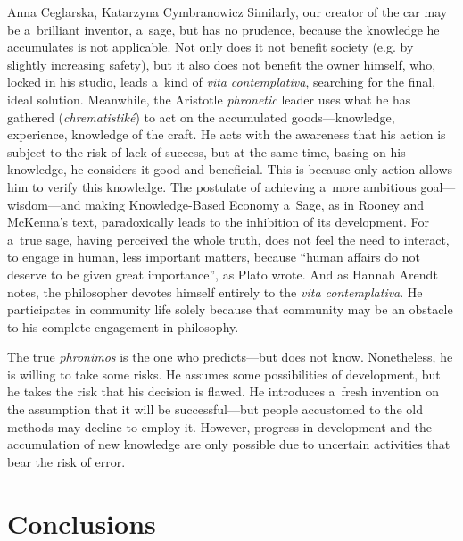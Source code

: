 \begin{artengenv2auth}{Anna Ceglarska, Katarzyna Cymbranowicz}
Similarly, our creator of the car may be a~brilliant inventor, a~sage, but has no prudence, because the knowledge he accumulates is not applicable. Not only does it not benefit society (e.g. by slightly increasing safety), but it also does not benefit the owner himself, who, locked in his studio, leads a~kind of \textit{vita} \textit{contemplativa}, searching for the final, ideal solution. Meanwhile, the Aristotle \textit{phronetic} leader uses what he has gathered (\textit{chrematistiké}) to act on the accumulated goods---knowledge, experience, knowledge of the craft. He acts with the awareness that his action is subject to the risk of lack of success, but at the same time, basing on his knowledge, he considers it good and beneficial. This is because only action allows him to verify this knowledge. The postulate of achieving a~more ambitious goal---wisdom---and making Knowledge-Based Economy a~Sage, as in Rooney and McKenna's text, paradoxically leads to the inhibition of its development. For a~true sage, having perceived the whole truth, does not feel the need to interact, to engage in human, less important matters, because ``human affairs do not deserve to be given great importance'', as Plato 
\parencite[][803b]{plato_plato_1967-1} %
 wrote. And as Hannah Arendt 
\parencite*[][p.32]{arendt_promise_2005} %
 notes, the philosopher devotes himself entirely to the \textit{vita contemplativa}. He participates in community life solely because that community may be an obstacle to his complete engagement in philosophy.



The true \textit{phronimos} is the one who predicts---but does not know. Nonetheless, he is willing to take some risks. He assumes some possibilities of development, but he takes the risk that his decision is flawed. He introduces a~fresh invention on the assumption that it will be successful---but people accustomed to the old methods may decline to employ it. However, progress in development and the accumulation of new knowledge are only possible due to uncertain activities that bear the risk of error.



\section{Conclusions}


\end{artengenv2auth}
